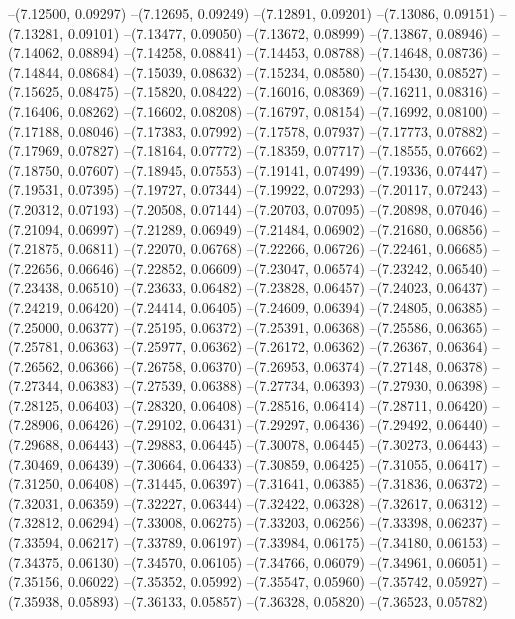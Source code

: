 --(7.12500, 0.09297)
--(7.12695, 0.09249)
--(7.12891, 0.09201)
--(7.13086, 0.09151)
--(7.13281, 0.09101)
--(7.13477, 0.09050)
--(7.13672, 0.08999)
--(7.13867, 0.08946)
--(7.14062, 0.08894)
--(7.14258, 0.08841)
--(7.14453, 0.08788)
--(7.14648, 0.08736)
--(7.14844, 0.08684)
--(7.15039, 0.08632)
--(7.15234, 0.08580)
--(7.15430, 0.08527)
--(7.15625, 0.08475)
--(7.15820, 0.08422)
--(7.16016, 0.08369)
--(7.16211, 0.08316)
--(7.16406, 0.08262)
--(7.16602, 0.08208)
--(7.16797, 0.08154)
--(7.16992, 0.08100)
--(7.17188, 0.08046)
--(7.17383, 0.07992)
--(7.17578, 0.07937)
--(7.17773, 0.07882)
--(7.17969, 0.07827)
--(7.18164, 0.07772)
--(7.18359, 0.07717)
--(7.18555, 0.07662)
--(7.18750, 0.07607)
--(7.18945, 0.07553)
--(7.19141, 0.07499)
--(7.19336, 0.07447)
--(7.19531, 0.07395)
--(7.19727, 0.07344)
--(7.19922, 0.07293)
--(7.20117, 0.07243)
--(7.20312, 0.07193)
--(7.20508, 0.07144)
--(7.20703, 0.07095)
--(7.20898, 0.07046)
--(7.21094, 0.06997)
--(7.21289, 0.06949)
--(7.21484, 0.06902)
--(7.21680, 0.06856)
--(7.21875, 0.06811)
--(7.22070, 0.06768)
--(7.22266, 0.06726)
--(7.22461, 0.06685)
--(7.22656, 0.06646)
--(7.22852, 0.06609)
--(7.23047, 0.06574)
--(7.23242, 0.06540)
--(7.23438, 0.06510)
--(7.23633, 0.06482)
--(7.23828, 0.06457)
--(7.24023, 0.06437)
--(7.24219, 0.06420)
--(7.24414, 0.06405)
--(7.24609, 0.06394)
--(7.24805, 0.06385)
--(7.25000, 0.06377)
--(7.25195, 0.06372)
--(7.25391, 0.06368)
--(7.25586, 0.06365)
--(7.25781, 0.06363)
--(7.25977, 0.06362)
--(7.26172, 0.06362)
--(7.26367, 0.06364)
--(7.26562, 0.06366)
--(7.26758, 0.06370)
--(7.26953, 0.06374)
--(7.27148, 0.06378)
--(7.27344, 0.06383)
--(7.27539, 0.06388)
--(7.27734, 0.06393)
--(7.27930, 0.06398)
--(7.28125, 0.06403)
--(7.28320, 0.06408)
--(7.28516, 0.06414)
--(7.28711, 0.06420)
--(7.28906, 0.06426)
--(7.29102, 0.06431)
--(7.29297, 0.06436)
--(7.29492, 0.06440)
--(7.29688, 0.06443)
--(7.29883, 0.06445)
--(7.30078, 0.06445)
--(7.30273, 0.06443)
--(7.30469, 0.06439)
--(7.30664, 0.06433)
--(7.30859, 0.06425)
--(7.31055, 0.06417)
--(7.31250, 0.06408)
--(7.31445, 0.06397)
--(7.31641, 0.06385)
--(7.31836, 0.06372)
--(7.32031, 0.06359)
--(7.32227, 0.06344)
--(7.32422, 0.06328)
--(7.32617, 0.06312)
--(7.32812, 0.06294)
--(7.33008, 0.06275)
--(7.33203, 0.06256)
--(7.33398, 0.06237)
--(7.33594, 0.06217)
--(7.33789, 0.06197)
--(7.33984, 0.06175)
--(7.34180, 0.06153)
--(7.34375, 0.06130)
--(7.34570, 0.06105)
--(7.34766, 0.06079)
--(7.34961, 0.06051)
--(7.35156, 0.06022)
--(7.35352, 0.05992)
--(7.35547, 0.05960)
--(7.35742, 0.05927)
--(7.35938, 0.05893)
--(7.36133, 0.05857)
--(7.36328, 0.05820)
--(7.36523, 0.05782)
